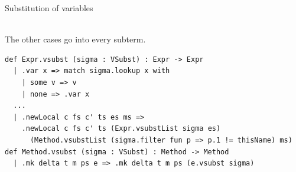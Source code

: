 \begin{cmp}{Substitution of variables}
\begin{paperside}
\\[1ex]
The other cases go into every subterm.
\end{paperside}
\begin{leanside}
\begin{lstlisting}[style=leanside]
def Expr.vsubst (sigma : VSubst) : Expr -> Expr
  | .var x => match sigma.lookup x with
    | some v => v
    | none => .var x
  ...
  | .newLocal c fs c' ts es ms =>
    .newLocal c fs c' ts (Expr.vsubstList sigma es)
      (Method.vsubstList (sigma.filter fun p => p.1 != thisName) ms)
def Method.vsubst (sigma : VSubst) : Method -> Method
  | .mk delta t m ps e => .mk delta t m ps (e.vsubst sigma)
\end{lstlisting}
\end{leanside}
\end{cmp}

